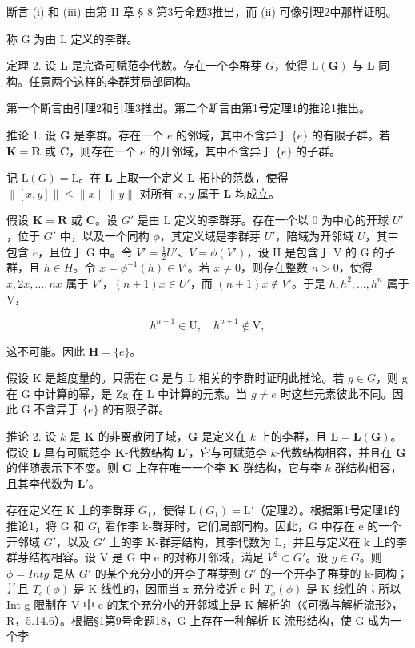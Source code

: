 断言 (i) 和 (iii) 由第 II 章 § 8 第3号命题3推出，而 (ii) 可像引理2中那样证明。

称 G 为由 L 定义的李群。

定理 2. 设 \(\mathbf{L}\) 是完备可赋范李代数。存在一个李群芽 \(G\)，使得 \(\mathrm{L}(\mathbf{G})\) 与 \(\mathbf{L}\) 同构。任意两个这样的李群芽局部同构。

第一个断言由引理2和引理3推出。第二个断言由第1号定理1的推论1推出。

推论 1. 设 \(\mathbf{G}\) 是李群。存在一个 \(e\) 的邻域，其中不含异于 \(\{e\}\) 的有限子群。若 \(\mathbf{K} = \mathbf{R}\) 或 \(\mathbf{C}\)，则存在一个 \(e\) 的开邻域，其中不含异于 \(\{e\}\) 的子群。

记 \(\mathrm{L}(G) = \mathrm{L}\)。在 \(\mathbf{L}\) 上取一个定义 \(\mathbf{L}\) 拓扑的范数，使得 \(\| [x,y]\| \leqslant \| x\| \| y\|\) 对所有 \(x,y\) 属于 \(\mathbf{L}\) 均成立。

假设 \(\mathbf{K} = \mathbf{R}\) 或 \(\mathbf{C}\)。设 \(G'\) 是由 L 定义的李群芽。存在一个以 0 为中心的开球 \(U'\)，位于 \(G'\) 中，以及一个同构 \(\phi\)，其定义域是李群芽 \(U'\)，陪域为开邻域 \(U\)，其中包含 \(e\)，且位于 G 中。令 \(V' = \frac{1}{2} U'\)、\(V = \phi(V')\)，设 H 是包含于 V 的 G 的子群，且 \(h \in H\)。令 \(x = \phi^{-1}(h) \in V'\)。若 \(x \neq 0\)，则存在整数 \(n > 0\)，使得 \(x, 2x, \ldots, nx\) 属于 \(V'\)，\((n + 1)x \in U'\)，而 \((n + 1)x \notin V'\)。于是 \(h, h^2, \ldots, h^n\) 属于 V，

\[
h ^ {n + 1} \in \mathrm{U}, \quad h ^ {n + 1} \notin \mathrm{V},
\]

这不可能。因此 \(\mathbf{H} = \{e\}\)。

假设 K 是超度量的。只需在 G 是与 L 相关的李群时证明此推论。若 \(g \in G\)，则 g 在 G 中计算的幂，是 Zg 在 L 中计算的元素。当 \(g \neq e\) 时这些元素彼此不同。因此 G 不含异于 \(\{e\}\) 的有限子群。

推论 2. 设 \(k\) 是 \(\mathbf{K}\) 的非离散闭子域，\(\mathbf{G}\) 是定义在 \(k\) 上的李群，且 \(\mathbf{L} = \mathbf{L}(\mathbf{G})\)。假设 \(\mathbf{L}\) 具有可赋范李 \(\mathbf{K}\)-代数结构 \(\mathbf{L}'\)，它与可赋范李 \(k\)-代数结构相容，并且在 \(\mathbf{G}\) 的伴随表示下不变。则 \(\mathbf{G}\) 上存在唯一一个李 \(\mathbf{K}\)-群结构，它与李 \(k\)-群结构相容，且其李代数为 \(\mathbf{L}'\)。

存在定义在 K 上的李群芽 \(G_{1}\)，使得 \(\mathrm{L}(G_{1}) = \mathrm{L}'\)（定理2）。根据第1号定理1的推论1，将 G 和 \(G_{1}\) 看作李 k-群芽时，它们局部同构。因此，G 中存在 e 的一个开邻域 \(G'\)，以及 \(G'\) 上的李 K-群芽结构，其李代数为 L，并且与定义在 k 上的李群芽结构相容。设 V 是 G 中 e 的对称开邻域，满足 \(V^{2} \subset G'\)。设 \(g \in G\)。则 \(\phi = Int g\) 是从 \(G'\) 的某个充分小的开李子群芽到 \(G'\) 的一个开李子群芽的 k-同构；并且 \(T_{e}(\phi)\) 是 K-线性的，因而当 x 充分接近 e 时 \(T_{x}(\phi)\) 是 K-线性的；所以 Int g 限制在 V 中 e 的某个充分小的开邻域上是 K-解析的（《可微与解析流形》，R，5.14.6）。根据§1第9号命题18，G 上存在一种解析 K-流形结构，使 G 成为一个李

